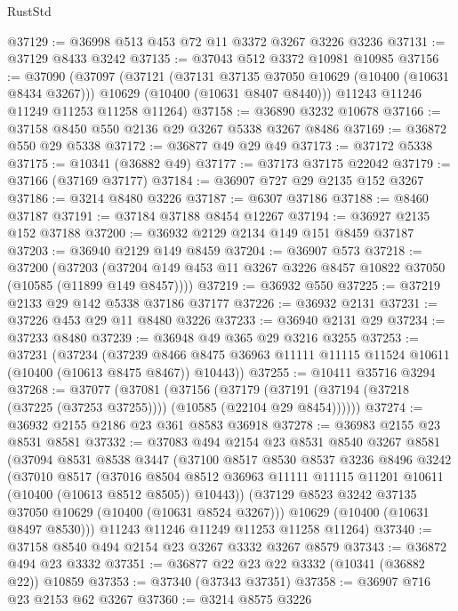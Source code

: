 \begin{lexlean}{RustStd}
\begin{coremodule}
{\begin{coremodule}
{{{{{{{{{{{{{{{{{{{{{{{{{@37129 := @36998 @513 @453 @72 @11 @3372 @3267 @3226 @3236
@37131 := @37129 @8433 @3242
@37135 := @37043 @512 @3372 @10981 @10985
@37156 := @37090
    (@37097
      (@37121
        (@37131 @37135 @37050 @10629 (@10400 (@10631 @8434 @3267)))
        @10629
        (@10400 (@10631 @8407 @8440)))
      @11243
      @11246
      @11249
      @11253
      @11258
      @11264)
@37158 := @36890 @3232 @10678
@37166 := @37158 @8450 @550 @2136 @29 @3267 @5338 @3267 @8486
@37169 := @36872 @550 @29 @5338
@37172 := @36877 @49 @29 @49
@37173 := @37172 @5338
@37175 := @10341 (@36882 @49)
@37177 := @37173 @37175 @22042
@37179 := @37166 (@37169 @37177)
@37184 := @36907 @727 @29 @2135 @152 @3267
@37186 := @3214 @8480 @3226
@37187 := @6307 @37186
@37188 := @8460 @37187
@37191 := @37184 @37188 @8454 @12267
@37194 := @36927 @2135 @152 @37188
@37200 := @36932 @2129 @2134 @149 @151 @8459 @37187
@37203 := @36940 @2129 @149 @8459
@37204 := @36907 @573
@37218 := @37200
    (@37203 (@37204 @149 @453 @11 @3267 @3226 @8457 @10822 @37050 (@10585 (@11899 @149 @8457))))
@37219 := @36932 @550
@37225 := @37219 @2133 @29 @142 @5338 @37186 @37177
@37226 := @36932 @2131
@37231 := @37226 @453 @29 @11 @8480 @3226
@37233 := @36940 @2131 @29
@37234 := @37233 @8480
@37239 := @36948 @49 @365 @29 @3216 @3255
@37253 := @37231
    (@37234
      (@37239 @8466 @8475 @36963 @11111 @11115 @11524 @10611 (@10400 (@10613 @8475 @8467)) @10443))
@37255 := @10411 @35716 @3294
@37268 := @37077
    (@37081
      (@37156
        (@37179 (@37191 (@37194 (@37218 (@37225 (@37253 @37255)))) (@10585 (@22104 @29 @8454))))))
@37274 := @36932 @2155 @2186 @23 @361 @8583 @36918
@37278 := @36983 @2155 @23 @8531 @8581
@37332 := @37083
    @494
    @2154
    @23
    @8531
    @8540
    @3267
    @8581
    (@37094
      @8531
      @8538
      @3447
      (@37100
        @8517
        @8530
        @8537
        @3236
        @8496
        @3242
        (@37010
          @8517
          (@37016
            @8504
            @8512
            @36963
            @11111
            @11115
            @11201
            @10611
            (@10400 (@10613 @8512 @8505))
            @10443))
        (@37129 @8523 @3242 @37135 @37050 @10629 (@10400 (@10631 @8524 @3267)))
        @10629
        (@10400 (@10631 @8497 @8530)))
      @11243
      @11246
      @11249
      @11253
      @11258
      @11264)
@37340 := @37158 @8540 @494 @2154 @23 @3267 @3332 @3267 @8579
@37343 := @36872 @494 @23 @3332
@37351 := @36877 @22 @23 @22 @3332 (@10341 (@36882 @22)) @10859
@37353 := @37340 (@37343 @37351)
@37358 := @36907 @716 @23 @2153 @62 @3267
@37360 := @3214 @8575 @3226
}}}}}}}}}}}}}}}}}}}}}}}}}
\end{coremodule}}
\end{coremodule}
\end{lexlean}
